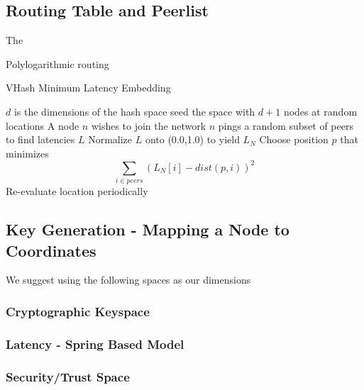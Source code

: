 \documentclass{IEEEtran}
\begin{document}



\subsection{Routing Table and Peerlist}
The


Polylogarithmic routing \cite{kleinberg2000navigation}















\begin{algorithm}
\caption{VHash Minimum Latency Embedding}
\label{latency}
\begin{algorithmic}[1]  %
	\STATE $d$ is the dimensions of the hash space
    \STATE seed the space with $d+1$ nodes at random locations
   	\STATE A node $n$ wishes to join the network
    \STATE $n$ pings a random subset of peers to find latencies $L$
    \STATE Normalize $L$ onto (0.0,1.0) to yield $L_N$
    \STATE Choose position $p$ that minimizes $$\sum\limits_{i\in peers}(L_N[i]-dist(p,i))^2$$ 
    \STATE Re-evaluate location periodically
\end{algorithmic}
\end{algorithm}




\subsection{Key Generation - Mapping a Node to Coordinates}

We suggest using the following spaces as our dimensions

\subsubsection{Cryptographic Keyspace}

\subsubsection{Latency - Spring Based Model}

\subsubsection{Security/Trust Space}
\end{document}

